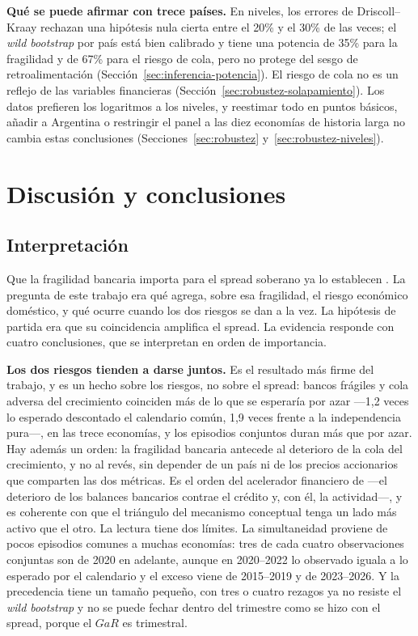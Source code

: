 \textbf{Qué se puede afirmar con trece países.} En niveles, los errores de Driscoll--Kraay rechazan una hipótesis nula cierta entre el 20\% y el 30\% de las veces; el \textit{wild bootstrap} por país está bien calibrado y tiene una potencia de 35\% para la fragilidad y de 67\% para el riesgo de cola, pero no protege del sesgo de retroalimentación (Sección~\ref{sec:inferencia-potencia}). El riesgo de cola no es un reflejo de las variables financieras (Sección~\ref{sec:robustez-solapamiento}). Los datos prefieren los logaritmos a los niveles, y reestimar todo en puntos básicos, añadir a Argentina o restringir el panel a las diez economías de historia larga no cambia estas conclusiones (Secciones~\ref{sec:robustez} y~\ref{sec:robustez-niveles}).

\section{Discusión y conclusiones}
\label{sec:discusion}

\subsection{Interpretación}

Que la fragilidad bancaria importa para el spread soberano ya lo establecen \citet{Chari2024b}. La pregunta de este trabajo era qué agrega, sobre esa fragilidad, el riesgo económico doméstico, y qué ocurre cuando los dos riesgos se dan a la vez. La hipótesis de partida era que su coincidencia amplifica el spread. La evidencia responde con cuatro conclusiones, que se interpretan en orden de importancia.

\textbf{Los dos riesgos tienden a darse juntos.} Es el resultado más firme del trabajo, y es un hecho sobre los riesgos, no sobre el spread: bancos frágiles y cola adversa del crecimiento coinciden más de lo que se esperaría por azar ---1,2 veces lo esperado descontado el calendario común, 1,9 veces frente a la independencia pura---, en las trece economías, y los episodios conjuntos duran más que por azar. Hay además un orden: la fragilidad bancaria antecede al deterioro de la cola del crecimiento, y no al revés, sin depender de un país ni de los precios accionarios que comparten las dos métricas. Es el orden del acelerador financiero de \citet{BernankeGertlerGilchrist1996} ---el deterioro de los balances bancarios contrae el crédito y, con él, la actividad---, y es coherente con que el triángulo del mecanismo conceptual tenga un lado más activo que el otro. La lectura tiene dos límites. La simultaneidad proviene de pocos episodios comunes a muchas economías: tres de cada cuatro observaciones conjuntas son de 2020 en adelante, aunque en 2020--2022 lo observado iguala a lo esperado por el calendario y el exceso viene de 2015--2019 y de 2023--2026. Y la precedencia tiene un tamaño pequeño, con tres o cuatro rezagos ya no resiste el \textit{wild bootstrap} y no se puede fechar dentro del trimestre como se hizo con el spread, porque el $GaR$ es trimestral.

